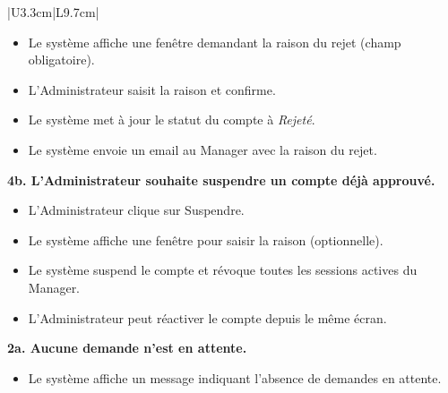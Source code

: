 \documentclass[a4paper,12pt]{report}
\begin{document}
\begin{longtable}{|U{3.3cm}|L{9.7cm}|}
\begin{itemize}
    \item[4.2] Le système affiche une fenêtre demandant la raison du
    rejet (champ obligatoire).
    \item[4.3] L'Administrateur saisit la raison et confirme.
    \item[4.4] Le système met à jour le statut du compte à \textit{Rejeté}.
    \item[4.5] Le système envoie un email au Manager avec la raison du
    rejet.
\end{itemize}
\textbf{4b. L'Administrateur souhaite suspendre un compte déjà approuvé.}
\begin{itemize}
    \item[4.1] L'Administrateur clique sur Suspendre.
    \item[4.2] Le système affiche une fenêtre pour saisir la raison
    (optionnelle).
    \item[4.3] Le système suspend le compte et révoque toutes les
    sessions actives du Manager.
    \item[4.4] L'Administrateur peut réactiver le compte depuis le même
    écran.
\end{itemize}
\textbf{2a. Aucune demande n'est en attente.}
\begin{itemize}
    \item[2.1] Le système affiche un message indiquant l'absence de demandes en attente.
\end{itemize} 
\end{longtable}
 
\end{document}
